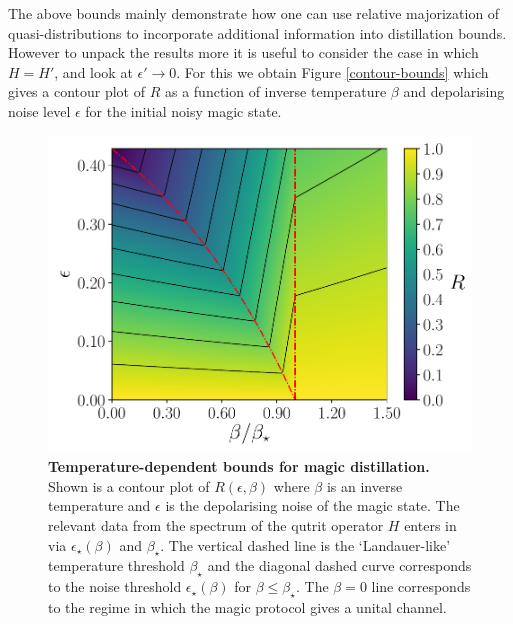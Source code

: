 \documentclass[pra,
aps,
twocolumn,
superscriptaddress,
groupedaddress,
nofootinbib,
reprint
]{revtex4-1}
\begin{document}
The above bounds mainly demonstrate how one can use relative majorization of quasi-distributions to incorporate additional information into distillation bounds. However to unpack the results more it is useful to consider the case in which $H=H'$, and look at $\epsilon' \rightarrow 0$. For this we obtain Figure \ref{contour-bounds} which gives a contour plot of $R$ as a function of inverse temperature $\beta$ and depolarising noise level $\epsilon$ for the initial noisy magic state.
\begin{figure}[t!]\label{contour-bounds}
    \centering
    \includegraphics[scale=0.4]{figs/rate_scatter.pdf}
    \caption{\textbf{Temperature-dependent bounds for magic distillation.}
  Shown is a contour plot of  $R(\epsilon, \beta)$ where $\beta$ is an inverse temperature and $\epsilon$ is the depolarising noise of the magic state. The relevant data from the spectrum of the qutrit operator $H$ enters in via $\epsilon_\star(\beta)$ and $\beta_\star$.  The vertical dashed line is the `Landauer-like' temperature threshold $\beta_\star$ and the diagonal dashed curve corresponds to the noise threshold $\epsilon_\star (\beta)$ for $\beta \leq \beta_\star$. The $\beta =0 $ line corresponds to the regime in which the magic protocol gives a unital channel.
    }
    \label{fig:rate_contour}
\end{figure}
\end{document}
